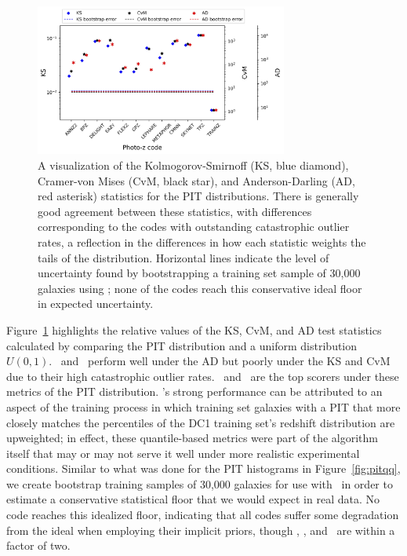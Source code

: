 \begin{figure}
\centering
\includegraphics[width=0.74\textwidth]{fig/KSvsCvMvsAD_PIT_withnull_jpg.jpg}
\caption{A visualization of the Kolmogorov-Smirnoff (KS, blue diamond), Cramer-von Mises (CvM, black star), and Anderson-Darling (AD, red asterisk) statistics for the PIT distributions.
There is generally good agreement between these statistics, with differences corresponding to the codes with outstanding catastrophic outlier rates, a reflection in the differences in how each statistic weights the tails of the distribution.
Horizontal lines indicate the level of uncertainty found by bootstrapping a training set sample of 30,000 galaxies using \trainz; none of the codes reach this conservative ideal floor in expected uncertainty.}
\label{fig:pit_stats}
\end{figure}

Figure~\ref{fig:pit_stats} highlights the relative values of the KS, CvM, and AD test statistics calculated by comparing the PIT distribution and a uniform distribution $U(0, 1)$.
\metaphor\ and \lephare\ perform well under the AD but poorly under the KS and CvM due to their high catastrophic outlier rates.
\annz\ and \flexzboost\  are the top scorers under these metrics of the PIT distribution.
\annz's strong performance can be attributed to an aspect of the training process in which training set galaxies with a PIT that more closely matches the percentiles of the DC1 training set's redshift distribution are upweighted; in effect, these quantile-based metrics were part of the algorithm itself that may or may not serve it well under more realistic experimental conditions.
Similar to what was done for the PIT histograms in Figure~\ref{fig:pitqq}, we create bootstrap training samples of 30,000 galaxies for use with \trainz\ in order to estimate a conservative statistical floor that we would expect in real data.
No code reaches this idealized floor, indicating that all codes suffer some degradation from the ideal when employing their implicit priors, though \annz, \flexzboost, and \gpz\ are within a factor of two.

